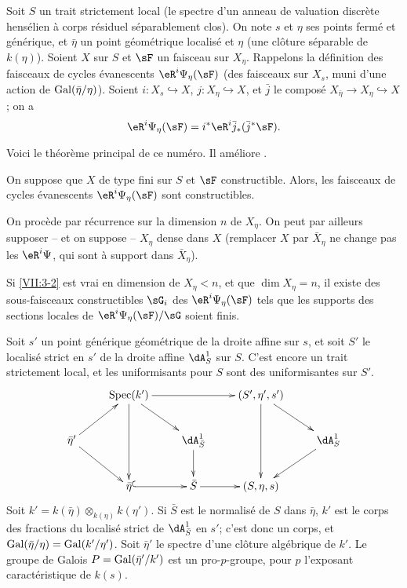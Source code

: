 Soit $S$ un trait strictement local (le spectre d'un anneau de valuation 
discrète hensélien à corps résiduel séparablement clos). On note $s$ et 
$\eta$ ses points fermé et générique, et $\bar\eta$ un point 
géométrique localisé et $\eta$ (une clôture séparable de $k(\eta)$). 
Soient $X$ sur $S$ et $\sF$ un faisceau sur $X_\eta$. Rappelons la 
définition des faisceaux de cycles évanescents $\eR^i \Psi_\eta(\sF)$ (des 
faisceaux sur $X_s$, muni d'une action de $\operatorname{Gal}(\bar\eta/\eta)$). Soient 
$i:X_s\hookrightarrow X$, $j:X_\eta \hookrightarrow X$, et $\bar j$ le 
composé $X_{\bar\eta}\to X_\eta \hookrightarrow X$; on a 
\[
  \eR^i \Psi_\eta(\sF) = i^\ast \eR^i \bar j_\ast (\bar j^\ast \sF) \text{.} 
\]

Voici le théorème principal de ce numéro. Il améliore 
\cite[XIII 2.3.1, 2.4.2]{sga7}. 





\begin{theorem_}\label{VII:3-2}
On suppose que $X$ de type fini sur $S$ et $\sF$ constructible. Alors, les 
faisceaux de cycles évanescents $\eR^i \Psi_\eta(\sF)$ sont constructibles. 
\end{theorem_}

On procède par récurrence sur la dimension $n$ de $X_\eta$. On peut par 
ailleurs supposer -- et on suppose -- $X_\eta$ dense dans $X$ (remplacer $X$ 
par $\bar X_\eta$ ne change pas les $\eR^i \Psi$, qui sont à support dans 
$\bar X_\eta$). 





\begin{lemma_}\label{VII:3-3}
Si \ref{VII:3-2} est vrai en dimension de $X_\eta<n$, et que $\dim X_\eta=n$, 
il existe des sous-faisceaux constructibles $\sG_i$ des $\eR^i \Psi_\eta(\sF)$ 
tels que les supports des sections locales de $\eR^i\Psi_\eta(\sF)/\sG$ soient 
finis. 
\end{lemma_}

Soit $s'$ un point générique géométrique de la droite affine sur $s$, 
et soit $S'$ le localisé strict en $s'$ de la droite affine $\dA_S^1$ sur 
$S$. C'est encore un trait strictement local, et les uniformisants pour $S$ 
sont des uniformisantes sur $S'$. 
\[\xymatrix{
  & \spec(k') \ar[rr] \ar[dd] \ar[dr] 
    & & (S',\eta',s') \ar[dr] \ar[dd] \\
  \bar\eta' \ar[ur] \ar[dr] 
    & & \dA_{\bar S}^1 \ar[d]  
    & & \dA_S^1 \ar[dl] \\
  & \bar\eta\ar@{^{(}->}[r] 
    & \bar S \ar[r] 
    & (S,\eta,s) 
}\]
Soit $k'=k(\bar\eta)\otimes_{k(\eta)}k(\eta')$. Si $\bar S$ est le normalisé 
de $S$ dans $\bar\eta$, $k'$ est le corps des fractions du localisé strict 
de $\dA_{\bar S}^1$ en $s'$; c'est donc un corps, et 
$\operatorname{Gal}(\bar\eta/\eta)=\operatorname{Gal}(k'/\eta')$. Soit $\bar\eta'$ le spectre d'une 
clôture algébrique de $k'$. Le groupe de Galois $P=\operatorname{Gal}(\bar\eta'/k')$ est 
un pro-$p$-groupe, pour $p$ l'exposant caractéristique de $k(s)$. 





